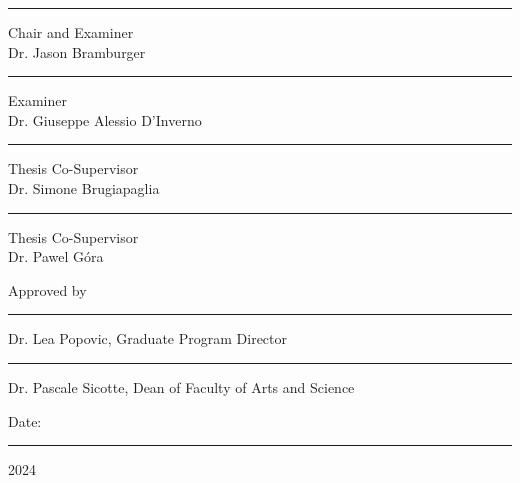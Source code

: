 \documentclass[12pt, oneside]{report}   	%
\begin{document}
\begin{flushright}
\begin{minipage}{13cm}
\rule{8cm}{0.1mm} Chair and Examiner\vspace{.2cm}\\
Dr. Jason Bramburger\vspace{.2cm}\\
\rule{8cm}{0.1mm} Examiner\vspace{.2cm}\\
Dr. Giuseppe Alessio D'Inverno\vspace{.2cm}\\
\rule{8cm}{0.1mm} Thesis Co-Supervisor\vspace{.2cm}\\
Dr. Simone Brugiapaglia\vspace{.2cm}\\
\rule{8cm}{0.1mm} Thesis Co-Supervisor\vspace{.2cm}\\
Dr. Pawel Góra
\end{minipage}
\end{flushright}
\vspace{.8cm}
Approved by\vspace{-.5cm}
\begin{flushright}
\begin{minipage}{13cm}
\rule{9cm}{0.1mm}
\end{minipage}
\end{flushright}
\vspace{-.7cm} %
\begin{flushright} 
Dr. Lea Popovic, Graduate Program Director
\vspace{.5cm}
\end{flushright}
\begin{flushright}
\begin{minipage}{13cm}
\rule{9cm}{0.1mm} 
\end{minipage}
\end{flushright}
\begin{flushright}
\vspace{-0.3cm}
Dr. Pascale Sicotte, Dean of Faculty of Arts and Science
\end{flushright}
\vspace{.5cm} %
Date: \rule{9cm}{0.1mm} 2024



\end{document}
